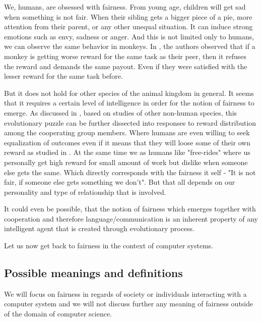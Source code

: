 
We, humans, are obsessed with fairness. From young age, children will get sad when something is not fair. When their sibling gets a bigger piece of a pie, more attention from their parent, or any other unequal situation. It can induce strong emotions such as envy, sadness or anger. And this is not limited only to humans, we can observe the same behavior in monkeys. In \cite{brosnan2003monkeys}, the authors observed that if a monkey is getting worse reward for the same task as their peer, then it refuses the reward and demands the same payout. Even if they were satisfied with the lesser reward for the same task before.



But it does not hold for other species of the animal kingdom in general. It seems that it requires a certain level of intelligence in order for the notion of fairness to emerge. As discussed in \cite{brosnan2014evolution}, based on studies of other non-human species, this evolutionary puzzle can be further dissected into responses to reward distribution among the cooperating group members. Where humans are even willing to seek equalization of outcomes even if it means that they will loose some of their own reward as studied in \cite{willing_to_pay_to_equality}. At the same time we as humans like "free-rides" where us personally get high reward for small amount of work but dislike when someone else gets the same. Which directly corresponds with the fairness it self - "It is not fair, if someone else gets something we don't". But that all depends on our personality and type of relationship that is involved.

It could even be possible, that the notion of fairness which emerges together with cooperation and therefore language/communication is an inherent property of any intelligent agent that is created through evolutionary process.

\newline
Let us now get back to fairness in the context of computer systems.

\subsection{Possible meanings and definitions}\label{subsec:02_general.possible_meanings}
We will focus on fairness in regards of society or individuals interacting with a computer system and we will not discuss further any meaning of fairness outside of the domain of computer science.

